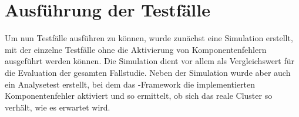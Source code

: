 \chapter{Ausführung der Testfälle}\label{chap:execution}

Um nun Testfälle ausführen zu können, wurde zunächst eine Simulation erstellt, mit der einzelne Testfälle ohne die Aktivierung von Komponentenfehlern ausgeführt werden können.
Die Simulation dient vor allem als Vergleichswert für die Evaluation der gesamten Fallstudie.
Neben der Simulation wurde aber auch ein Analysetest erstellt, bei dem das \sS-Framework die implementierten Komponentenfehler aktiviert und so ermittelt, ob sich das reale Cluster so verhält, wie es erwartet wird.




